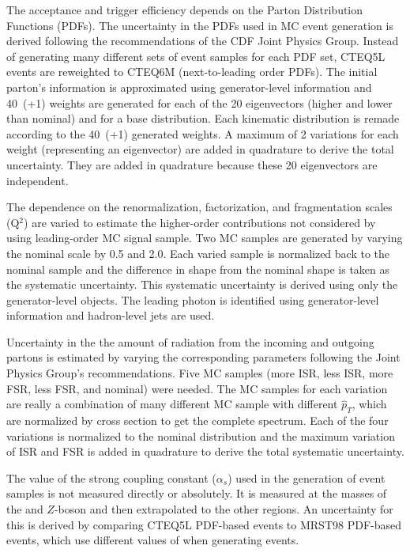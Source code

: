 \documentclass[12pt,twoside,letterpaper,doublespace]{article}
\begin{document}
The acceptance and trigger efficiency depends on the Parton Distribution Functions (PDFs). The uncertainty in the PDFs used in MC event generation is derived following the recommendations of the CDF Joint Physics Group. Instead of generating many different sets of \MC event samples for each PDF set, {\sc CTEQ5L} events are reweighted to {\sc CTEQ6M} (next-to-leading order PDFs). The initial parton's information is approximated using generator-level information and 40~(+1) weights are generated for each of the 20 eigenvectors (higher and lower than nominal) and for a base distribution. Each kinematic distribution is remade according to the 40~(+1) generated weights. A maximum of 2 variations for each weight (representing an eigenvector) are added in quadrature to derive the total uncertainty. They are added in quadrature because these 20 eigenvectors are independent.

The dependence on the renormalization, factorization, and fragmentation scales (Q$^{2}$) are varied to estimate the higher-order contributions not considered by using leading-order MC signal sample. Two MC samples are generated by varying the nominal scale by 0.5 and 2.0. Each varied sample is normalized back to the nominal sample and the difference in shape from the nominal shape is taken as the systematic uncertainty. This systematic uncertainty is derived using only the generator-level objects. The leading photon is identified using generator-level information and hadron-level jets are used.

Uncertainty in the the amount of radiation from the incoming and outgoing partons is estimated by varying the corresponding \pythiaText parameters following the Joint Physics Group's recommendations. Five MC samples (more ISR, less ISR, more FSR, less FSR, and nominal) were needed. The MC samples for each variation are really a combination of many different MC sample with different $\hat{p}_{T}$, which are normalized by cross section to get the complete spectrum. Each of the four variations is normalized to the nominal distribution and the maximum variation of ISR and FSR is added in quadrature to derive the total systematic uncertainty.

The value of the strong coupling constant ($\alpha_s$) used in the generation of \MC event samples is not measured directly or absolutely. It is measured at the masses of the \pizero and $Z$-boson and then extrapolated to the other regions. An uncertainty for this is derived by comparing CTEQ5L PDF-based \MC events to MRST98 PDF-based \MC events, which use different values of \alphas when generating events.
\end{document}
